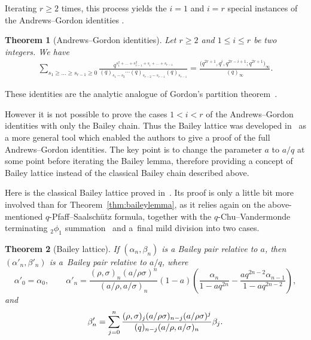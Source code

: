 \documentclass[pdftex]{sigma}
\numberwithin{equation}{section}
\newtheorem{Theorem}{Theorem}[section]
\begin{document}
Iterating $r\geq 2$ times, this process yields the $i=1$ and $i=r$ special instances of the Andrews--Gordon identities \cite{A74}.

\begin{Theorem}[Andrews--Gordon identities]\label{th:AGseries}
Let $r \geq 2$ and $1 \leq i \leq r$ be two integers. We have
\begin{gather}\label{AG}
\sum_{s_1\geq\dots\geq s_{r-1}\geq0}\frac{q^{s_1^2+\dots+s_{r-1}^2+s_{i}+\dots+s_{r-1}}}{(q)_{s_1-s_2}\cdots(q)_{s_{r-2}-s_{r-1}}(q)_{s_{r-1}}}=\frac{\bigl(q^{2r+1},q^{i},q^{2r-i+1};q^{2r+1}\bigr)_\infty}{(q)_\infty}.
\end{gather}
\end{Theorem}
These identities are the analytic analogue of Gordon's partition theorem~\cite{Go}.

However it is not possible to prove the cases $1 < i < r$ of the Andrews--Gordon identities with only the Bailey chain. Thus the Bailey lattice was developed in~\cite{AAB} as a more general tool which enabled the authors to give a proof of the full Andrews--Gordon identities. The key point is to change the parameter $a$ to $a/q$ at some point before iterating the Bailey lemma, therefore providing a concept of Bailey lattice instead of the classical Bailey chain described above.

Here is the classical Bailey lattice proved in~\cite{AAB}. Its proof is only a little bit more involved than for Theorem~\ref{thm:baileylemma}, as it relies again on the above-mentioned $q$-Pfaff--Saalsch\"utz formula, together with the $q$-Chu--Vandermonde terminating $_2\phi_1$ summation~\cite[formula~(II.6)]{GR} and a~final mild division into two cases.

\begin{Theorem}[Bailey lattice]\label{thm:baileylattice}
If $(\alpha_n, \beta_n)$ is a Bailey pair relative to $a$, then $(\alpha'_n, \beta'_n)$ is a~Bailey pair relative to $a/q$, where
\begin{equation*}
\alpha'_0=\alpha_0, \qquad \alpha'_n=\frac{(\rho,\sigma)_n(a/\rho\sigma)^n}{(a/\rho,a/\sigma)_n}(1-a)\left(\frac{\alpha_n}{1-aq^{2n}}-\frac{aq^{2n-2}\alpha_{n-1}}{1-aq^{2n-2}}\right),
\end{equation*}
and
\begin{equation*}\beta'_n=\sum_{j=0}^n{(\rho,\sigma)_j(a/\rho\sigma)_{n-j}(a/\rho\sigma)^j\over (q)_{n-j}(a/\rho,a/\sigma)_n} \beta_j.
\end{equation*}
\end{Theorem}
\end{document}

